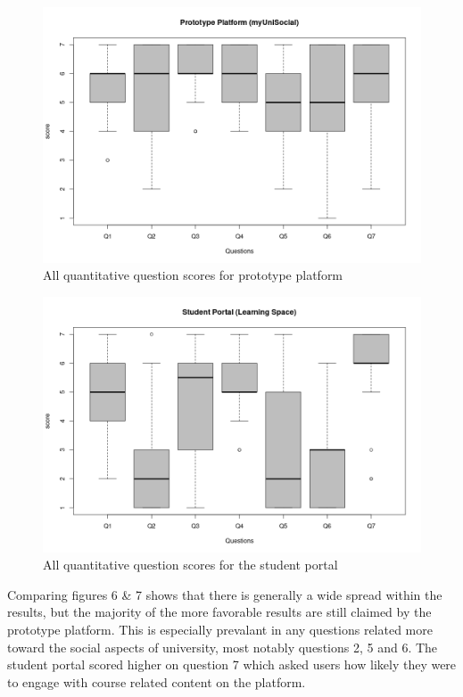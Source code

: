 \documentclass[lettersize,journal]{IEEEtran}
\begin{document}
		\begin{figure}[h!]
        		\includegraphics[width=\linewidth]{images/PrototypeFull.png}
        		\caption{All quantitative question scores for prototype platform}
        		\label{figure 5}
		\end{figure}
		\begin{figure}[h!]
        		\includegraphics[width=\linewidth]{images/StudentPortalFull.png}
        		\caption{All quantitative question scores for the student portal}
        		\label{figure 6}
		\end{figure}

		Comparing figures 6 \& 7 shows that there is generally a wide spread within the results, but the majority of the more favorable results are still claimed by the prototype platform.
		This is especially prevalant in any questions related more toward the social aspects of university, most notably questions 2, 5 and 6. The student portal scored higher on question 7
		 which asked users how likely they were to engage with course related content on the platform.
\end{document}
